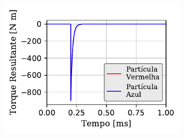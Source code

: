 \begin{figure}[htb!]
{\begin{subfigure}[t]{\smallresultsfigwidth}
			\caption{}
			\label{subfig:colliding_spheres:dissipative_rotation:y_contact_force}
		\end{subfigure}
		\begin{subfigure}[t]{\smallresultsfigwidth}
			\centering
			\includegraphics[scale=1]{images/colliding_spheres/dissipative_rotation/resultingTorque-Z_small.pdf}
			\caption{}
			\label{subfig:colliding_spheres:dissipative_rotation:z_torque}
		\end{subfigure}
	}
	\label{fig:colliding_spheres:dissipative_rotation:forces_and_torque_results}
	\sourceMe
\end{figure}

